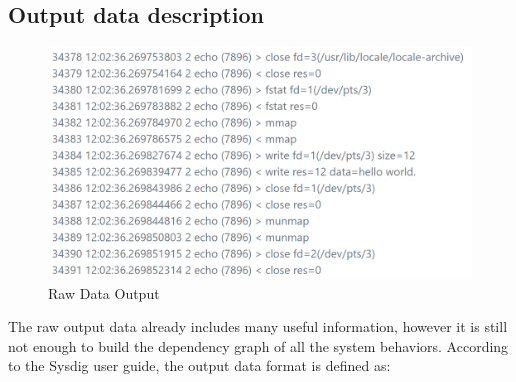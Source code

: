 \subsection{Output data description}
\begin{figure}[h]
	\centering
	\includegraphics[scale=0.5]{fig1}
	\caption{Raw Data Output}
\end{figure}
The raw output data already includes many useful information, however it is still not enough to build the dependency graph of all the system behaviors. According to the Sysdig user guide, the output data format is defined as: 
\vspace{0.2em}


